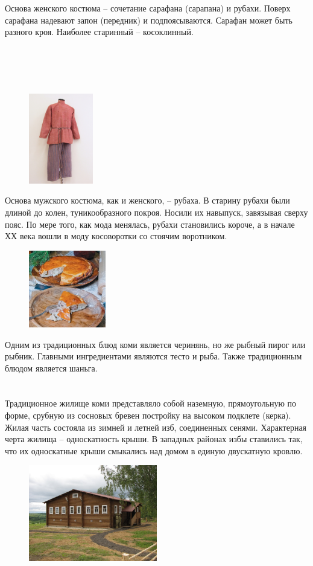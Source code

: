 \documentclass[a4paper,14pt]{extarticle}
\begin{document}
	Основа женского костюма – сочетание сарафана (сарапана) и рубахи. Поверх сарафана надевают запон (передник) и подпоясываются. Сарафан может быть разного кроя. Наиболее старинный – косоклинный.\\\\\\\\\\
	
	\newpage
	\begin{figure}
		\centering
		\includegraphics[width=0.25\textwidth]{images/m}
	\end{figure}
	
	Основа мужского костюма, как и женского, – рубаха. В старину рубахи были длиной до колен, туникообразного покроя. Носили их навыпуск, завязывая сверху пояс. По мере того, как мода менялась, рубахи становились короче, а в начале ХХ века вошли в моду косоворотки со стоячим воротником.\\
	
	\begin{figure}
		\centering
		\includegraphics[width=0.3\textwidth]{images/ch}
	\end{figure}
	
	Одним из традиционных блюд коми является черинянь, но же рыбный пирог или рыбник. Главными ингредиентами являются тесто и рыба. Также традиционным блюдом является шаньга.\\\\\\
	
	Традиционное жилище коми представляло собой наземную, прямоугольную по форме, срубную из сосновых бревен постройку на высоком подклете (керка). Жилая часть состояла из зимней и летней изб, соединенных сенями. Характерная черта жилища -- односкатность крыши. В западных районах избы ставились так, что их односкатные крыши смыкались над домом в единую двускатную кровлю.
	
	\begin{figure}[h]
		\centering
		\includegraphics[width=0.5\textwidth]{images/h}
	\end{figure}
\end{document}
